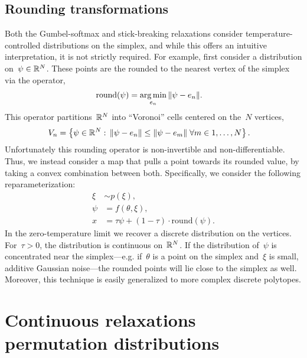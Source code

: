 \subsection{Rounding transformations}
Both the Gumbel-softmax and stick-breaking relaxations consider
temperature-controlled distributions on the simplex, and while this
offers an intuitive interpretation, it is not strictly required.  For
example, first consider a distribution on~$\psi \in \mathbb{R}^N$. These
points are the rounded to the nearest vertex of the simplex via the
operator,
\begin{align}
  \mathrm{round}(\psi) &= \argmin_{e_n} \| \psi - e_n \|.
\end{align}
This operator partitions~$\mathbb{R}^N$ into ``Voronoi'' cells
centered on the~$N$ vertices,
\begin{align}
  V_n &=
        \left\{\psi \in \mathbb{R}^N: \, 
        \| \psi - e_n \| \leq \| \psi - e_m \| \;
        \forall m \in 1, \ldots, N \right\}.
\end{align}
Unfortunately this rounding operator is non-invertible and
non-differentiable.  Thus, we instead consider a map that pulls a
point towards its rounded value, by taking a convex combination
between both. Specifically, we consider the following reparameterization:
\begin{align}
  \xi &\sim p(\xi), \\
  \psi &= f(\theta, \xi), \\
  x &=  \tau \psi + (1-\tau) \cdot \mathrm{round}(\psi) .
\end{align}
In the zero-temperature limit we recover a discrete distribution on
the vertices. For~$\tau > 0$, the distribution is continuous
on~$\mathbb{R}^N$. If the distribution of~$\psi$ is concentrated
near the simplex---e.g. if~$\theta$ is a point on the simplex
and~$\xi$ is small, additive Gaussian noise---the rounded points
will lie close to the simplex as well. Moreover, this technique
is easily generalized to more complex discrete polytopes. 
 
\section{Continuous relaxations permutation distributions}
\label{sec:permutation}

